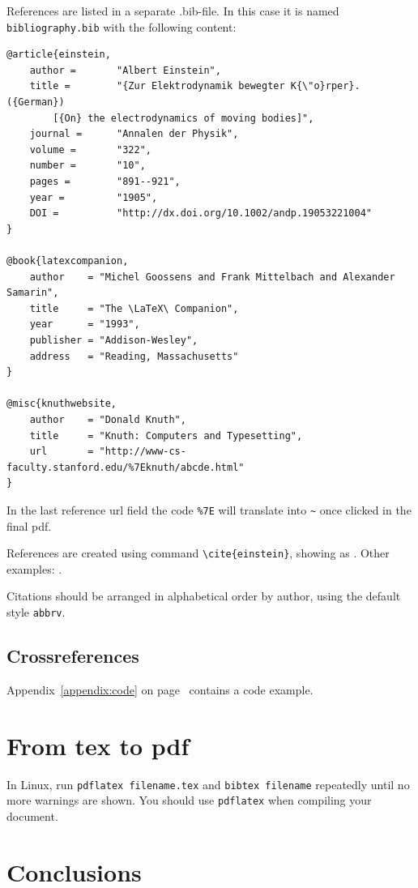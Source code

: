 \documentclass[english,twoside,openright]{HYgraduMLDS}
\begin{document}
References are listed in a separate .bib-file. In this case it is named \texttt{bibliography.bib} with the following content:
\begin{verbatim}
@article{einstein,
    author =       "Albert Einstein",
    title =        "{Zur Elektrodynamik bewegter K{\"o}rper}. ({German})
        [{On} the electrodynamics of moving bodies]",
    journal =      "Annalen der Physik",
    volume =       "322",
    number =       "10",
    pages =        "891--921",
    year =         "1905",
    DOI =          "http://dx.doi.org/10.1002/andp.19053221004"
}
 
@book{latexcompanion,
    author    = "Michel Goossens and Frank Mittelbach and Alexander Samarin",
    title     = "The \LaTeX\ Companion",
    year      = "1993",
    publisher = "Addison-Wesley",
    address   = "Reading, Massachusetts"
}
 
@misc{knuthwebsite,
    author    = "Donald Knuth",
    title     = "Knuth: Computers and Typesetting",
    url       = "http://www-cs-faculty.stanford.edu/%7Eknuth/abcde.html"
}
\end{verbatim}

In the last reference url field the code \verb+%7E+ will translate into \verb+~+ once clicked in the final pdf.

References are created using command \texttt{\textbackslash cite\{einstein\}}, showing as \cite{einstein}. Other examples: \cite{latexcompanion,knuthwebsite}.

Citations should be arranged in alphabetical order by author, using the default style \texttt{abbrv}.



\section{Crossreferences}

Appendix~\ref{appendix:code} on page~\pageref{appendix:code} contains a code example.

\chapter{From tex to pdf}

In Linux, run \texttt{pdflatex filename.tex} and \texttt{bibtex
  filename} repeatedly until no more warnings are shown. You should
use \texttt{pdflatex} when compiling your document.
 
\chapter{Conclusions\label{chapter:conclusions}}
\end{document}
